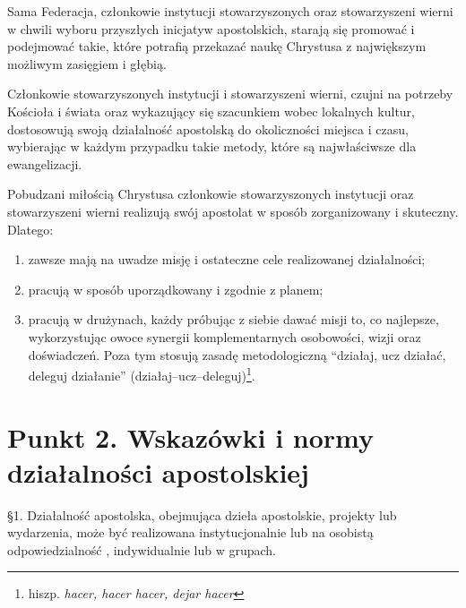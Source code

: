 

 Sama Federacja, członkowie instytucji stowarzyszonych oraz stowarzyszeni wierni w chwili wyboru przyszłych inicjatyw apostolskich, starają się promować i podejmować takie, które potrafią przekazać naukę Chrystusa z największym możliwym zasięgiem i głębią.
 


 Członkowie stowarzyszonych instytucji i stowarzyszeni wierni, czujni na potrzeby Kościoła i świata oraz wykazujący się szacunkiem wobec lokalnych kultur, dostosowują swoją działalność apostolską do okoliczności miejsca i czasu, wybierając w każdym przypadku takie metody, które są najwłaściwsze dla ewangelizacji.
 


 Pobudzani miłością Chrystusa członkowie stowarzyszonych instytucji oraz stowarzyszeni wierni realizują swój apostolat w sposób zorganizowany i skuteczny. Dlatego:


\begin{enumerate}


\item zawsze mają na uwadze misję i ostateczne cele realizowanej działalności;


\item pracują w sposób uporządkowany i zgodnie z planem;


\item pracują w drużynach, każdy próbując z siebie dawać misji to, co najlepsze, wykorzystując owoce synergii komplementarnych osobowości, wizji oraz doświadczeń. Poza tym stosują zasadę metodologiczną “działaj, ucz działać, deleguj działanie” (działaj--ucz--deleguj)\footnote{hiszp. {\em hacer, hacer hacer, dejar hacer}}.


\end{enumerate}




\section{Punkt 2. Wskazówki i normy działalności apostolskiej}


 
 \S{}1. Działalność apostolska, obejmująca dzieła apostolskie, projekty lub wydarzenia, może być realizowana instytucjonalnie lub na osobistą odpowiedzialność , indywidualnie lub w grupach.


